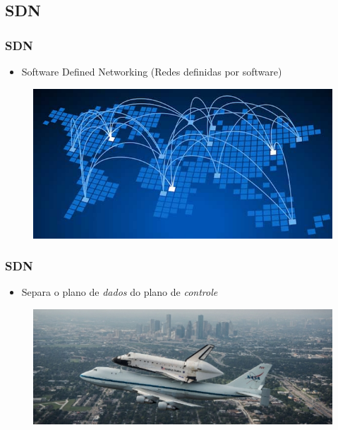 
\subsection{SDN}

%
%
\begin{frame}\frametitle{SDN}

    \begin{itemize}
    \item Software Defined Networking (Redes definidas por software)
    \end{itemize}
        \begin{figure}[h]
        \centering
        \includegraphics[scale=0.5]{images/sdn.jpg}
    \end{figure}
\end{frame}


%
%
\begin{frame}\frametitle{SDN}

    \begin{itemize}
    \item Separa o plano de \emph{dados} do plano de \emph{controle}
    \end{itemize}
        \begin{figure}[h]
        \centering
        \includegraphics[scale=0.5]{images/planes.jpg}
    \end{figure}
\end{frame}


